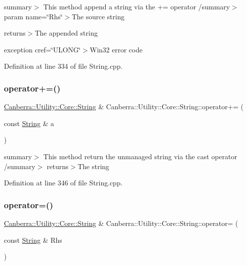 summary$>$ This method append a string via the += operator /summary$>$ param name=\char`\"{}\+Rhs\char`\"{}$>$The source string

returns$>$The appended string

exception cref=\char`\"{}\+U\+L\+O\+N\+G\char`\"{}$>$Win32 error code

Definition at line 334 of file String.\+cpp.

\mbox{\label{class_canberra_1_1_utility_1_1_core_1_1_string_a91a6f32fe364ff81ca670532c330d8d4_a91a6f32fe364ff81ca670532c330d8d4}} 
\subsubsection{\texorpdfstring{operator+=()}{operator+=()}}
{\footnotesize\ttfamily \hyperlink{class_canberra_1_1_utility_1_1_core_1_1_string}{Canberra\+::\+Utility\+::\+Core\+::\+String} \& Canberra\+::\+Utility\+::\+Core\+::\+String\+::operator+= (\begin{DoxyParamCaption}\item[{const \hyperlink{class_canberra_1_1_utility_1_1_core_1_1_string}{String} \&}]{a }\end{DoxyParamCaption})}

summary$>$ This method return the unmanaged string via the cast operator /summary$>$ returns$>$The string

Definition at line 346 of file String.\+cpp.

\mbox{\label{class_canberra_1_1_utility_1_1_core_1_1_string_a4ac5dc85ea2f2f52c5729806c8d5480b_a4ac5dc85ea2f2f52c5729806c8d5480b}} 
\subsubsection{\texorpdfstring{operator=()}{operator=()}}
{\footnotesize\ttfamily \hyperlink{class_canberra_1_1_utility_1_1_core_1_1_string}{Canberra\+::\+Utility\+::\+Core\+::\+String} \& Canberra\+::\+Utility\+::\+Core\+::\+String\+::operator= (\begin{DoxyParamCaption}\item[{const \hyperlink{class_canberra_1_1_utility_1_1_core_1_1_string}{String} \&}]{Rhs }\end{DoxyParamCaption})}

